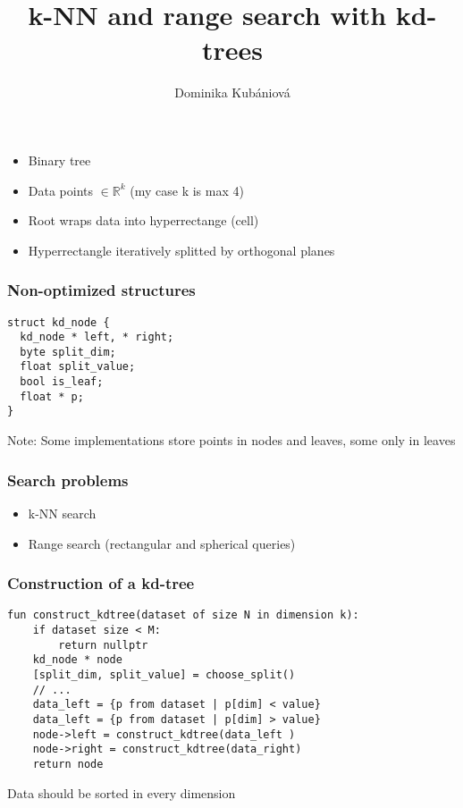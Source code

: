 \documentclass{beamer}
\title{k-NN and range search with kd-trees}
\author{Dominika Kubániová}
\begin{document}
\begin{frame}
\titlepage
\end{frame}

\begin{frame}

\begin{itemize}
 \frametitle{kd-tree}
 \item Binary tree
 \item Data points $ \in \mathbb{R}^k $ (my case k is max 4)
 \item Root wraps data into hyperrectange (cell)
 \item Hyperrectangle iteratively splitted by orthogonal planes
\end{itemize}

\end{frame}

\begin{frame}[fragile]
 \frametitle{Non-optimized structures}
   \begin{lstlisting}[style=CStyle]
struct kd_node {
  kd_node * left, * right;
  byte split_dim;
  float split_value;
  bool is_leaf;
  float * p;
}
\end{lstlisting}

Note: Some implementations store points in nodes and leaves, some only in leaves

\end{frame}


\begin{frame}
 \frametitle{Search problems}
 \begin{itemize}
  \item k-NN search
  \item Range search (rectangular and spherical queries)
 \end{itemize}

\end{frame}

\begin{frame}[fragile]
 \frametitle{Construction of a kd-tree}
 \begin{lstlisting}[style=CStyle]
fun construct_kdtree(dataset of size N in dimension k):
    if dataset size < M:
        return nullptr
    kd_node * node
    [split_dim, split_value] = choose_split()
    // ...
    data_left = {p from dataset | p[dim] < value}
    data_left = {p from dataset | p[dim] > value}
    node->left = construct_kdtree(data_left )
    node->right = construct_kdtree(data_right)
    return node
 \end{lstlisting}
\item Data should be sorted in every dimension


\end{frame}
\end{document}
